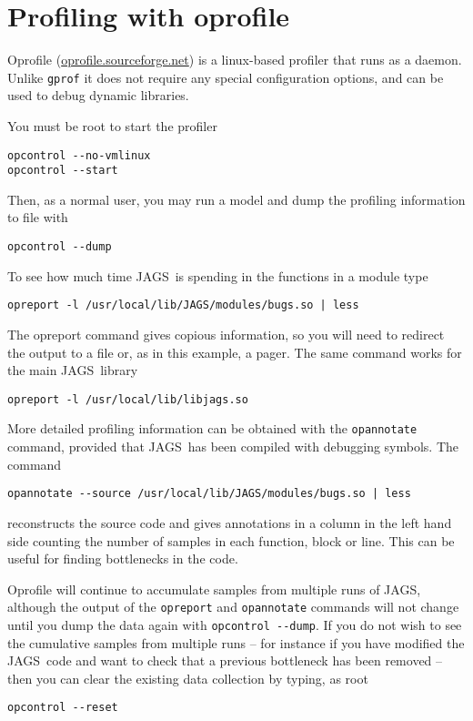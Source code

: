 \documentclass[11pt, a4paper, titlepage]{report}
\newcommand{\JAGS}{\textsf{JAGS}}
\begin{document}
\section{Profiling with oprofile}

Oprofile (\url{oprofile.sourceforge.net}) is a linux-based profiler
that runs as a daemon. Unlike \texttt{gprof} it does not require any
special configuration options, and can be used to debug dynamic libraries.

You must be root to start the profiler
\begin{verbatim}
opcontrol --no-vmlinux
opcontrol --start
\end{verbatim}
Then, as a normal user, you may run a model and dump the profiling
information to file with
\begin{verbatim}
opcontrol --dump
\end{verbatim}

To see how much time \JAGS\ is spending in the functions in a module
type
\begin{verbatim}
opreport -l /usr/local/lib/JAGS/modules/bugs.so | less
\end{verbatim}
The opreport command gives copious information, so you will need to
redirect the output to a file or, as in this example, a pager.
The same command works for the main \JAGS\ library
\begin{verbatim}
opreport -l /usr/local/lib/libjags.so
\end{verbatim}

More detailed profiling information can be obtained with the
\verb+opannotate+ command, provided that \JAGS\ has been compiled
with debugging symbols. The command
\begin{verbatim}
opannotate --source /usr/local/lib/JAGS/modules/bugs.so | less
\end{verbatim}
reconstructs the source code and gives annotations in a column in
the left hand side counting the number of samples in each function,
block or line. This can be useful for finding bottlenecks in the code.

Oprofile will continue to accumulate samples from multiple runs of JAGS,
although the output of the \verb+opreport+ and \verb+opannotate+ commands
will not change until you dump the data again with \verb+opcontrol --dump+.
If you do not wish to see the cumulative samples from multiple runs --
for instance if you have modified the \JAGS\ code and want to check that
a previous bottleneck has been removed -- then you can clear the existing
data collection by typing, as root
\begin{verbatim}
opcontrol --reset
\end{verbatim}
\end{document}

